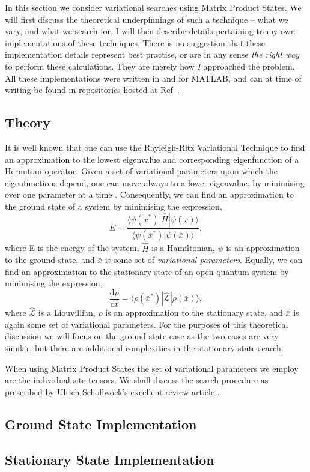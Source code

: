 In this section we consider variational searches using Matrix Product States. We will first discuss the theoretical underpinnings of such a technique -- what we vary, and what we search for. I will then describe details pertaining to my own implementations of these techniques. There is no suggestion that these implementation details represent best practise, or are in any sense \emph{the right way} to perform these calculations. They are merely how \emph{I} approached the problem. All these implementations were written in and for MATLAB, and can at time of writing be found in repositories hosted at Ref~\cite{otb:githome}.
 
 \subsection{Theory}
It is well known that one can use the Rayleigh-Ritz Variational Technique to find an approximation to the lowest eigenvalue and corresponding eigenfunction of a Hermitian operator. Given a set of variational parameters upon which the eigenfunctions depend, one can move always to a lower eigenvalue, by minimising over one parameter at a time \cite{ArfWeb_RRVT, Gasiorowicz_RVT}. Consequently, we can find an approximation to the ground state of a system by minimising the expression,
\begin{equation}
E = \frac{\langle \psi (\bar{x}^{*}) | \hat{H} | \psi (\bar{x}) \rangle}{\langle \psi (\bar{x}^{*}) | \psi (\bar{x}) \rangle},
\label{eq:vs1-1}
\end{equation}
where E is the energy of the system, \(\hat{H}\) is a Hamiltonian, \(\psi\) is an approximation to the ground state, and \( \bar{x} \) is some set of \emph{variational parameters}. Equally, we can find an approximation to the stationary state of an open quantum system by minimising the expression,
\begin{equation}
\frac{\mathrm{d}\rho}{\mathrm{d}t} = \langle \rho(\bar{x}^{*}) | \hat{\mathcal{L}} | \rho(\bar{x}) \rangle,
\label{eq:vs1-2}
\end{equation}
where \(\hat{\mathcal{L}}\) is a Liouvillian, \(\rho\) is an approximation to the stationary state, and \(\bar{x}\) is again some set of variational parameters. For the purposes of this theoretical discussion we will focus on the ground state case as the two cases are very similar, but there are additional complexities in the stationary state search. 

When using Matrix Product States the set of variational parameters we employ are the individual site tensors. We shall discuss the search procedure as prescribed by Ulrich Schollw\"{o}ck's excellent review article \cite{Schollwoeck11}.
 
 \subsection{Ground State Implementation}
 
 \subsection{Stationary State Implementation}